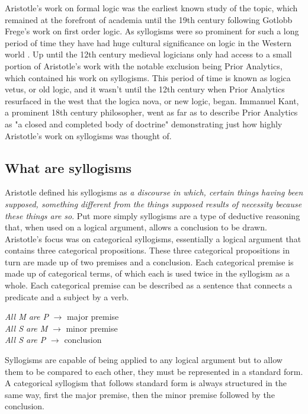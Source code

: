 \documentclass[12pt,a4paper]{report}
\newenvironment{tightcenter}{%
  \setlength\topsep{0pt}
  \setlength\parskip{0pt}
  \begin{center}
}{%
  \end{center}
}
\begin{document}
Aristotle's work on formal logic was the earliest known study of the topic, which remained at the forefront of academia until the 19th century following Gotlobb Frege's work on first order logic. As syllogisms were so prominent for such a long period of time they have had huge cultural significance on logic in the Western world \citep{sep-aristotle-logic}. Up until the 12th century medieval logicians only had access to a small portion of Aristotle's work with the notable exclusion being Prior Analytics, which contained his work on syllogisms. This period of time is known as logica vetus, or old logic, and it wasn't until the 12th century when Prior Analytics resurfaced in the west that the logica nova, or new logic, began. Immanuel Kant, a prominent 18th century philosopher, went as far as to describe Prior Analytics as "a closed and completed body of doctrine" demonstrating just how highly Aristotle's work on syllogisms was thought of.

\subsection{What are syllogisms}
Aristotle defined his syllogisms as \textit{a discourse in which, certain things having been supposed, something different from the things supposed results of necessity because these things are so}. Put more simply syllogisms are a type of deductive reasoning that, when used on a logical argument, allows a conclusion to be drawn. Aristotle's focus was on categorical syllogisms, essentially a  logical argument that contains three categorical propositions. These three categorical propositions in turn are made up of two premises and a conclusion. Each categorical premise is made up of categorical terms, of which each is used twice in the syllogism as a whole. Each categorical premise can be described as a sentence that connects a predicate and a subject by a verb. 
\bigbreak
\begin{tightcenter}
\textit{All M are P} $\rightarrow$ major premise\\
\textit{All S are M} $\rightarrow$ minor premise\\
\textit{All S are P} $\rightarrow$ conclusion \\
\end{tightcenter}
\bigbreak
Syllogisms are capable of being applied to any logical argument but to allow them to be compared to each other, they must be represented in a standard form. A categorical syllogism that follows standard form is always structured in the same way, first the major premise, then the minor premise followed by the conclusion. 
\end{document}
